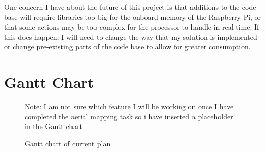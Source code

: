 \documentclass[progress]{cmpreport}
\begin{document}
One concern I have about the future of this project is that additions to the code base will require libraries too big for the onboard memory of the Raspberry Pi,
or that some actions may be too complex for the processor to handle in real time.
If this does happen, I will need to change the way that my solution is implemented or change pre-existing parts of the code base to allow for greater consumption.

\section{Gantt Chart}

\begin{figure}[h]
	\noindent{}
	\caption{Gantt chart of current plan}
	Note: I am not sure which feature I will be working on once I have completed the aerial mapping task so i have inserted a placeholder in the Gantt chart
\end{figure}
\end{document}
